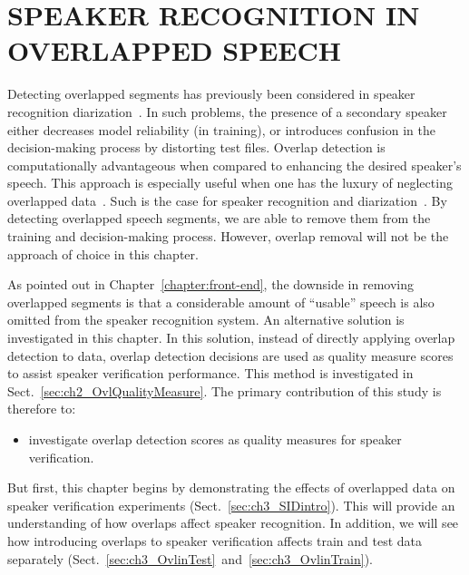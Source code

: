 \chapter{SPEAKER RECOGNITION IN OVERLAPPED SPEECH}
\label{chapter:ovl_in_sid}
Detecting overlapped segments has previously been considered in speaker recognition diarization~\cite{boakye_thesis,yantorno_report}. 
In such problems, the presence of a secondary speaker either decreases model reliability (in training), or introduces confusion in the decision-making process by distorting test files. 
Overlap detection is computationally advantageous when compared to enhancing the desired speaker's speech. 
This approach is especially useful when one has the luxury of neglecting overlapped data~\cite{yantorno_report}. 
Such is the case for speaker recognition and diarization~\cite{Boakye_is_08}. 
By detecting overlapped speech segments, we are able to remove them from the training and decision-making process. However, overlap removal will not be the approach of choice in this chapter. 

As pointed out in Chapter~\ref{chapter:front-end}, the downside in removing overlapped segments is that a considerable amount of ``usable'' speech is also omitted from the speaker recognition system. 
An alternative solution is investigated in this chapter. 
In this solution, instead of directly applying overlap detection to data, overlap detection decisions are used as quality measure scores to assist speaker verification performance. 
This method is investigated in Sect.~\ref{sec:ch2_OvlQualityMeasure}. 
The primary contribution of this study is therefore to:
\begin{itemize}
	\item investigate overlap detection scores as quality measures for speaker verification. 
\end{itemize}
But first, this chapter begins by demonstrating the effects of overlapped data on speaker verification experiments (Sect.~\ref{sec:ch3_SIDintro}). 
This will provide an understanding of how overlaps affect speaker recognition. 
In addition, we will see how introducing overlaps to speaker verification affects train and test data separately (Sect.~\ref{sec:ch3_OvlinTest}~and~\ref{sec:ch3_OvlinTrain}). 


